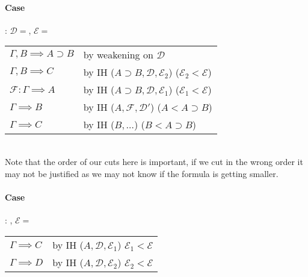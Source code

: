 \documentclass[12 pt]{article}
\begin{document}
         \paragraph{Case}: $\mathcal{D}=$\noLine{}\DP, $\mathcal{E} =$
         \noLine{}\noLine{}\DP
         \\
         \begin{tabular}{l l}
           $\Gamma, B \implies A \supset B$& by weakening on $\mathcal{D}$
           \\ $\Gamma, B \implies C$ & by IH ($A \supset B, \mathcal{D}, \mathcal{E}_2$) ($\mathcal{E}_2 < \mathcal{E}$)
           \\ $\mathcal{F}: \Gamma \implies A$ & by IH ($A \supset B, \mathcal{D}, \mathcal{E}_1$) ($\mathcal{E}_1 < \mathcal{E}$)
           \\ $\Gamma \implies B$ & by IH ($A, \mathcal{F}, \mathcal{D}'$) ($A < A \supset B$)
           \\ $\Gamma \implies C$ & by IH ($B, \ldots$) ($B < A \supset B$)
         \end{tabular}
         \\ Note that the order of our cuts here is important, if we
         cut in the wrong order it may not be justified as we may not
         know if the formula is getting smaller.
         \paragraph{Case}: \noLine{}\DP, $\mathcal{E} =$\noLine{}\noLine{}\DP
         \\
         \begin{tabular}{l l}
           $\Gamma \implies C$ & by IH ($A, \mathcal{D}, \mathcal{E}_1$) $\mathcal{E}_1 < \mathcal{E}$
           \\ $\Gamma \implies D$ & by IH ($A, \mathcal{D}, \mathcal{E}_2$) $\mathcal{E}_2 < \mathcal{E}$
         \end{tabular}
\end{document}
